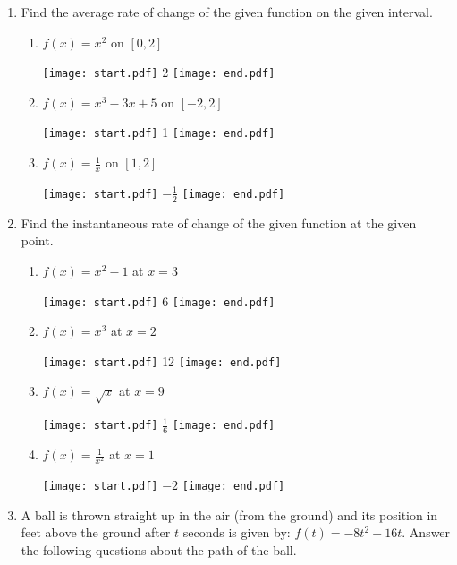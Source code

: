 \documentclass[12pt]{article}
\begin{document}
\begin{enumerate}

\item Find the average rate of change of the given function on the given interval.

\begin{enumerate}

\item $f(x) = x^2$ on $[0,2]$ 

\texttt{[image: start.pdf]}
{{2}}
\texttt{[image: end.pdf]}


\item $f(x) = x^3-3x+5$ on $[-2,2]$ 

\texttt{[image: start.pdf]}
{{1}}
\texttt{[image: end.pdf]}


\item $\displaystyle f(x) = \frac{1}{x}$ on $[1,2]$ 

\texttt{[image: start.pdf]}
{{$\displaystyle -\frac{1}{2}$}}
\texttt{[image: end.pdf]}


\end{enumerate}

\item Find the instantaneous rate of change of the given function at the given point. 

\begin{enumerate}

\item $f(x) = x^2-1$ at $x=3$

\texttt{[image: start.pdf]}
{{6}}
\texttt{[image: end.pdf]}


\item $f(x) = x^3$ at $x=2$ 

\texttt{[image: start.pdf]}
{{12}}
\texttt{[image: end.pdf]}


\item $f(x)=\sqrt{x}$ at $x=9$

\texttt{[image: start.pdf]}
{{$\displaystyle \frac{1}{6}$}}
\texttt{[image: end.pdf]}


\item $\displaystyle f(x) = \frac{1}{x^2}$ at $x=1$ 

\texttt{[image: start.pdf]}
{{$-2$}}
\texttt{[image: end.pdf]}


\end{enumerate}

\item A ball is thrown straight up in the air (from the ground) and its position in feet above the ground after $t$ seconds is given by: $f(t) = -8t^2+16t$. Answer the following questions about the path of the ball. 


\end{enumerate}
\end{document}
